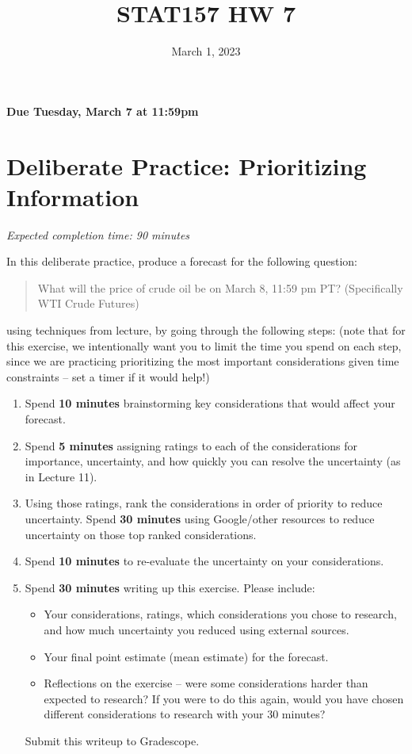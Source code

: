 \documentclass[11pt]{article}
\title{STAT157 HW 7}
\date{March 1, 2023}
\begin{document}
\maketitle

\hfill \textbf{Due Tuesday, March 7 at 11:59pm}

\section*{Deliberate Practice: Prioritizing Information}

\emph{Expected completion time: 90 minutes}

In this deliberate practice, produce a forecast for the following question:
\begin{quote}
	What will the price of crude oil be on March 8, 11:59 pm PT? (Specifically WTI Crude Futures)
\end{quote}
using techniques from lecture, by going through the following steps: (note that for this exercise, we intentionally want you to limit the time you spend on each step, since we are practicing prioritizing the most important considerations given time constraints -- set a timer if it would help!)

\begin{enumerate}
	\item Spend \textbf{10 minutes} brainstorming key considerations that would affect your forecast. 
	\item Spend \textbf{5 minutes} assigning ratings to each of the considerations for importance, uncertainty, and how quickly you can resolve the uncertainty (as in Lecture 11).
	\item Using those ratings, rank the considerations in order of priority to reduce uncertainty. Spend \textbf{30 minutes} using Google/other resources to reduce uncertainty on those top ranked considerations. 
	\item Spend \textbf{10 minutes} to re-evaluate the uncertainty on your considerations.
	\item Spend \textbf{30 minutes} writing up this exercise. Please include:
	\begin{itemize}
		\item Your considerations, ratings, which considerations you chose to research, and how much uncertainty you reduced using external sources.
		\item Your final point estimate (mean estimate) for the forecast.
		\item Reflections on the exercise -- were some considerations harder than expected to research? If you were to do this again, would you have chosen different considerations to research with your 30 minutes?
	\end{itemize}
 Submit this writeup to Gradescope.
\end{enumerate}  
\end{document}
